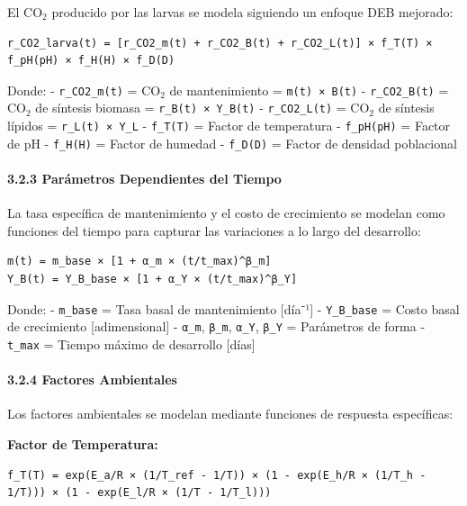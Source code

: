 \documentclass[
]{article}
\begin{document}
El CO$_2$ producido por las larvas se modela siguiendo un enfoque DEB
mejorado:

\begin{verbatim}
r_CO2_larva(t) = [r_CO2_m(t) + r_CO2_B(t) + r_CO2_L(t)] × f_T(T) × f_pH(pH) × f_H(H) × f_D(D)
\end{verbatim}

Donde: - \texttt{r\_CO2\_m(t)} = CO$_2$ de mantenimiento =
\texttt{m(t)\ ×\ B(t)} - \texttt{r\_CO2\_B(t)} = CO$_2$ de síntesis biomasa
= \texttt{r\_B(t)\ ×\ Y\_B(t)} - \texttt{r\_CO2\_L(t)} = CO$_2$ de síntesis
lípidos = \texttt{r\_L(t)\ ×\ Y\_L} - \texttt{f\_T(T)} = Factor de
temperatura - \texttt{f\_pH(pH)} = Factor de pH - \texttt{f\_H(H)} =
Factor de humedad - \texttt{f\_D(D)} = Factor de densidad poblacional

\paragraph{3.2.3 Parámetros Dependientes del
Tiempo}\label{paruxe1metros-dependientes-del-tiempo}

La tasa específica de mantenimiento y el costo de crecimiento se modelan
como funciones del tiempo para capturar las variaciones a lo largo del
desarrollo:

\begin{verbatim}
m(t) = m_base × [1 + α_m × (t/t_max)^β_m]
Y_B(t) = Y_B_base × [1 + α_Y × (t/t_max)^β_Y]
\end{verbatim}

Donde: - \texttt{m\_base} = Tasa basal de mantenimiento {[}día⁻¹{]} -
\texttt{Y\_B\_base} = Costo basal de crecimiento {[}adimensional{]} -
\texttt{α\_m}, \texttt{β\_m}, \texttt{α\_Y}, \texttt{β\_Y} = Parámetros
de forma - \texttt{t\_max} = Tiempo máximo de desarrollo {[}días{]}

\paragraph{3.2.4 Factores Ambientales}\label{factores-ambientales}

Los factores ambientales se modelan mediante funciones de respuesta
específicas:

\textbf{Factor de Temperatura:}

\begin{verbatim}
f_T(T) = exp(E_a/R × (1/T_ref - 1/T)) × (1 - exp(E_h/R × (1/T_h - 1/T))) × (1 - exp(E_l/R × (1/T - 1/T_l)))
\end{verbatim}
\end{document}
